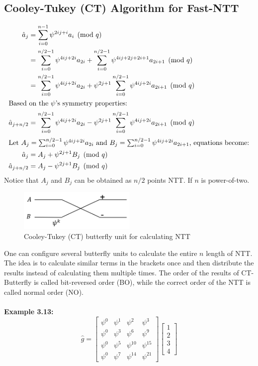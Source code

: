 \documentclass[12pt]{report}
\begin{document}
\subsection{Cooley-Tukey (CT) Algorithm for Fast-NTT}

\begin{align*}
    \hat{a}_{j} &= \sum_{i=0}^{n-1}\psi^{2ij+i}a_{i} \pmod{q} \\
    &= \sum_{i=0}^{n/2-1}\psi^{4ij+2i}a_{2i} + \sum_{i=0}^{n/2-1}\psi^{4ij+2j+2i+1}a_{2i+1} \pmod{q} \\
    &= \sum_{i=0}^{n/2-1}\psi^{4ij+2i}a_{2i} + \psi^{2j+1}\sum_{i=0}^{n/2-1}\psi^{4ij+2i}a_{2i+1} \pmod{q} \\
    \intertext{Based on the $\psi$'s symmetry properties:}
    \hat{a}_{j+n/2} &= \sum_{i=0}^{n/2-1}\psi^{4ij+2i}a_{2i} - \psi^{2j+1}\sum_{i=0}^{n/2-1}\psi^{4ij+2i}a_{2i+1} \pmod{q} \\
    \intertext{Let $A_{j}=\sum_{i=0}^{n/2-1}\psi^{4ij+2i}a_{2i}$ and $B_{j}=\sum_{i=0}^{n/2-1}\psi^{4ij+2i}a_{2i+1}$, equations become:}
    \hat{a}_{j} &= A_{j} + \psi^{2j+1}B_{j} \pmod{q} \\
    \hat{a}_{j+n/2} &= A_{j} - \psi^{2j+1}B_{j} \pmod{q}
    \end{align*}
Notice that $A_j$ and $B_j$ can be obtained as $n/2$ points NTT. If $n$ is power-of-two.
\begin{figure}[H]
    \centering
    \includegraphics[width=0.5\textwidth]{./ntt_figures/4.png}
    \caption{Cooley-Tukey (CT) butterfly unit for calculating NTT}
    \label{fig:butterfly}
\end{figure}
\noindent One can configure several butterfly units to calculate the entire $n$ length of NTT. The idea is to calculate similar terms in the brackets once and then distribute the results instead of calculating them multiple times. The order of the results of CT-Butterfly is called bit-reversed order (BO), while the correct order of the NTT is called normal order (NO). \\ \\

\noindent \textbf{Example 3.13:} 
\[
\hat{g} = 
\begin{bmatrix}
\psi^0 & \psi^1 & \psi^2 & \psi^3 \\
\psi^0 & \psi^3 & \psi^6 & \psi^9 \\
\psi^0 & \psi^5 & \psi^{10} & \psi^{15} \\
\psi^0 & \psi^7 & \psi^{14} & \psi^{21}
\end{bmatrix}
\begin{bmatrix}
1 \\
2 \\
3 \\
4
\end{bmatrix}
\]
\end{document}
